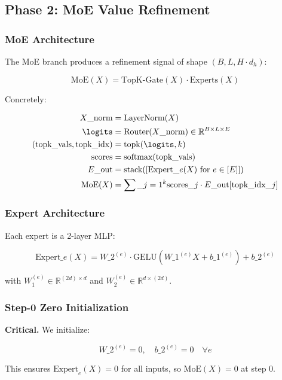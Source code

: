 \subsection{Phase 2: MoE Value Refinement}

\subsubsection{MoE Architecture}

The MoE branch produces a refinement signal of shape 
$(B, L, H \cdot d_h)$:

\[
\text{MoE}(X) = \text{TopK-Gate}(X) \cdot \text{Experts}(X)
\]

Concretely:

\[
\begin{aligned}
X\_\text{norm} &= \text{LayerNorm}(X) \\
\logits &= \text{Router}(X\_\text{norm}) \in \mathbb{R}^{B \times L \times E} \\
(\text{topk\_vals}, \text{topk\_idx}) &= \text{topk}(\logits, k) \\
\text{scores} &= \text{softmax}(\text{topk\_vals}) \\
E\_\text{out} &= \text{stack}([\text{Expert}\_e(X) \text{ for } e \in [E]]) \\
\text{MoE}(X) &= \sum\_{j=1}^{k} \text{scores}\_j \cdot E\_\text{out}[\text{topk\_idx}\_j]
\end{aligned}
\]

\subsubsection{Expert Architecture}

Each expert is a 2-layer MLP:

\[
\text{Expert}\_e(X) = W\_2^{(e)} \cdot \text{GELU}(W\_1^{(e)} X + b\_1^{(e)}) + b\_2^{(e)}
\]

with $W_1^{(e)} \in \mathbb{R}^{(2d) \times d}$ and 
$W_2^{(e)} \in \mathbb{R}^{d \times (2d)}$.

\subsubsection{Step-0 Zero Initialization}

\textbf{Critical.} We initialize:

\[
W\_2^{(e)} = 0, \quad b\_2^{(e)} = 0 \quad \forall e
\]

This ensures $\text{Expert}_e(X) = 0$ for all inputs, so 
$\text{MoE}(X) = 0$ at step 0.

